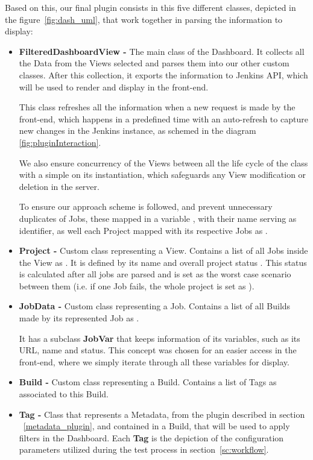 Based on this, our final plugin consists in this five different classes, depicted in the figure~\ref{fig:dash_uml}, that work together in parsing the information to display:

\begin{itemize}
\item \textbf{FilteredDashboardView - } The main class of the Dashboard. It collects all the Data from the Views selected and parses them into our other custom classes. After this collection, it exports the information to Jenkins API, which will be used to render and display in the front-end.

This class refreshes all the information when a new request is made by the front-end, which happens in a predefined time with an auto-refresh to capture new changes in the Jenkins instance, as schemed in the diagram \ref{fig:pluginInteraction}. 

We also ensure concurrency of the Views between all the life cycle of the class with a simple  on its instantiation, which safeguards any View modification or deletion in the server. 

To ensure our approach scheme is followed, and prevent unnecessary duplicates of Jobs, these mapped in a variable , with their name serving as identifier, as well each Project mapped with its respective Jobs as .

\item \textbf{Project - } Custom class representing a View. Contains a list of all Jobs inside the View as . It is defined by its name  and overall project status . This status is calculated after all jobs are parsed and is set as the worst case scenario between them (i.e. if one Job fails, the whole project is set as ).

\item \textbf{JobData - } Custom class representing a Job. Contains a list of all Builds made by its represented Job as . 

It has a subclass \textbf{JobVar} that keeps information of its variables, such as its URL, name and status. This concept was chosen for an easier access in the front-end, where we simply iterate through all these variables for display.

\item \textbf{Build -} Custom class representing a Build. Contains a list of Tags as   associated to this Build.

\item \textbf{Tag - } Class that represents a Metadata, from the plugin described in section ~\ref{metadata_plugin},  and  contained in a Build, that will be used to apply filters in the Dashboard. Each \textbf{Tag} is the depiction of the configuration parameters utilized during the test process in section~\ref{sc:workflow}.
\end{itemize}

